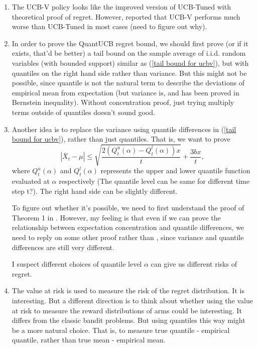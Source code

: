 \documentclass{article}
\begin{document}
\begin{enumerate}
    \item The UCB-V policy looks like the improved version of UCB-Tuned with theoretical proof of regret. However, \cite{garivier2011kl} reported that UCB-V performs much worse than UCB-Tuned in most cases (need to figure out why). 
    
    \item In order to prove the QuantUCB regret bound, we should first prove (or if it exists, that'd be better) a tail bound on the sample average of i.i.d. random variables (with bounded support) similar as (\ref{tail bound for ucbv}), but with quantiles on the right hand side rather than variance. But this might not be possible, since quantile is not the natural term to describe the deviations of empirical mean from expectation (but variance is, and has been proved in Bernstein inequality). Without concentration proof, just trying multiply terms outside of quantiles doesn't sound good. 
    
    \item Another idea is to replace the variance using quantile differences in (\ref{tail bound for ucbv}), rather than just quantiles. That is, we want to prove
    $$\left|\overline{X}_{t}-\mu\right| \leq \sqrt{\frac{2 (Q_t^u(\alpha) - Q_t^l(\alpha)) x}{t}}+\frac{3 b x}{t},$$
    where $Q_t^u(\alpha)$ and $Q_t^l(\alpha)$ represents the upper and lower quantile function evaluated at $\alpha$ respectively (The quantile level can be same for different time step t?). The right hand side can be slightly different.
    
    To figure out whether it's possible, we need to first understand the proof of Theorem 1 in \cite{AUDIBERT20091876}. However, my feeling is that even if we can prove the relationship between expectation concentration and quantile differences, we need to reply on some other proof rather than \cite{AUDIBERT20091876}, since variance and quantile differences are still very different.
    
    I suspect different choices of quantile level $\alpha$ can give us different risks of regret. 
    
    \item The value at risk is used to measure the risk of the regret distribution. It is interesting. But a different direction is to think about whether using the value at risk to measure the reward distributions of arms could be interesting. It differs from the classic bandit problems. But using quantiles this way might be a more natural choice. That is, to measure true quantile - empirical quantile,  rather than true mean - empirical mean. 
\end{enumerate}
\end{document}
